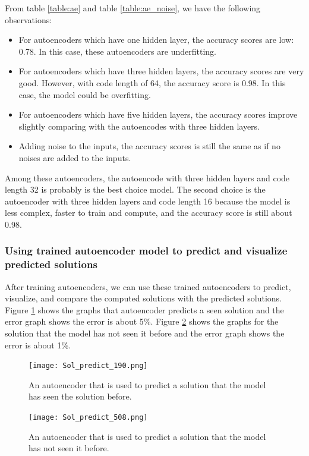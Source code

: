\documentclass{article}
\begin{document}
\noindent From table \ref{table:ae} and table \ref{table:ae_noise}, we have the following observations:
\begin{itemize}
	\item For autoencoders which have one hidden layer, the accuracy scores are low: 0.78. In this case, these autoencoders are underfitting.
	\item For autoencoders which have three hidden layers, the accuracy scores are very good. However, with code length of 64, the accuracy score is 0.98. In this case, the model could be overfitting.
	\item For autoencoders which have five hidden layers, the accuracy scores improve slightly comparing with the autoencodes with three hidden layers.
	\item Adding noise to the inputs, the accuracy scores is still the same as if no noises are added to the inputs.  
\end{itemize}
Among these autoencoders, the autoencode with three hidden layers and code length 32 is probably is the best choice model. The second choice is the autoencoder with three hidden layers and code length 16 because the model is less complex, faster to train and compute, and the accuracy score is still about 0.98.

\subsubsection{Using trained autoencoder model to predict and visualize predicted solutions}
After training autoencoders, we can use these trained autoencoders to predict, visualize, and compare the computed solutions with the predicted solutions. Figure \ref{fig:Sol190} shows the graphs that autoencoder predicts a seen solution and the error graph shows the error is about 5\%. Figure \ref{fig:Sol508} shows the graphs for the solution that the model has not seen it before and the error graph shows the error is about 1\%.

\begin{figure}[h]
	\centering
	\texttt{[image: Sol\_predict\_190.png]}
	\caption{An autoencoder that is used to predict a solution that the model has seen the solution before.}
	\label{fig:Sol190}
\end{figure}

\begin{figure}[h]
	\centering
	\texttt{[image: Sol\_predict\_508.png]}
	\caption{An autoencoder that is used to predict a solution that the model has not seen it before.}
	\label{fig:Sol508}
\end{figure}
\end{document}
